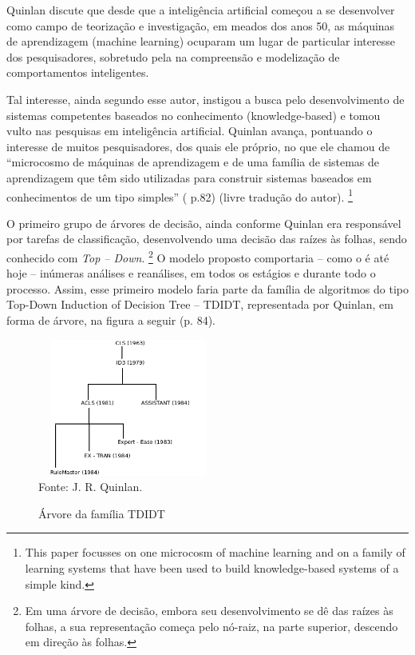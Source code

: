 Quinlan \cite{Quinlan86inductionof} discute que desde que a inteligência artificial começou a se desenvolver como campo de teorização e investigação, em meados dos anos 50, as máquinas de aprendizagem (machine learning) ocuparam um lugar de particular interesse dos pesquisadores, sobretudo pela na compreensão e modelização de comportamentos inteligentes. 

Tal interesse, ainda segundo esse autor, instigou a busca pelo desenvolvimento de sistemas competentes baseados no conhecimento (knowledge-based) e tomou vulto nas pesquisas em inteligência artificial. Quinlan \cite{Quinlan86inductionof} avança, pontuando o interesse de muitos pesquisadores, dos quais ele próprio, no que ele chamou de “microcosmo de máquinas de aprendizagem e de uma família de sistemas de aprendizagem que têm sido utilizadas para construir sistemas baseados em conhecimentos de um tipo simples” ( p.82) (livre tradução do autor). \footnote{This paper focusses on one microcosm of machine learning and on a family of learning systems that have been used to build knowledge-based systems of a simple kind.}

O primeiro grupo de árvores de decisão, ainda conforme Quinlan \cite{Quinlan86inductionof} era responsável por tarefas de classificação, desenvolvendo uma decisão das raízes às folhas, sendo conhecido com \textit{Top -- Down}. 
\footnote{ Em uma árvore de decisão, embora seu desenvolvimento se dê das raízes às folhas, a sua representação começa pelo nó-raiz, na parte superior, descendo em direção às folhas.} O modelo proposto comportaria – como o é até hoje – inúmeras análises e reanálises, em todos os estágios e durante todo o processo. Assim, esse primeiro modelo faria parte da família de algoritmos do tipo Top-Down Induction of Decision Tree – TDIDT, representada por Quinlan, em forma de árvore, na figura a seguir (p. 84).

\begin{figure}[!ht]
	\centering
	\caption{Árvore da família TDIDT}
	\includegraphics[width=60mm, height=45mm]{Figuras/Arvore/TDIDT.png}\\
	\tiny Fonte: J. R. Quinlan. 
\end{figure} 

